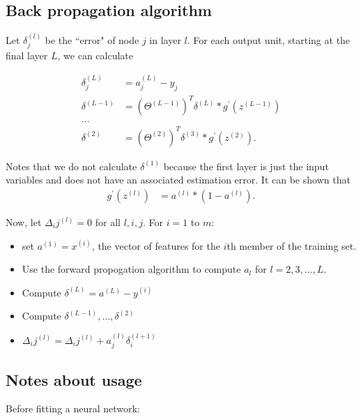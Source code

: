 \documentclass{article}
\begin{document}
\subsection{Back propagation algorithm}

Let $\delta_j^{(l)}$ be the ``error" of node $j$ in layer $l$. For each output unit, starting at the final layer $L$, we can calculate

\begin{align}
\delta_j^{(L)} & = a_j^{(L)} - y_j \nonumber \\
\delta^{(L-1)} & = (\Theta^{(L-1)})^T \delta^{(L)} * g^{\prime}(z^{(L-1)}) \nonumber \\
\dots \nonumber \\
\delta^{(2)} & = (\Theta^{(2)})^T \delta^{(3)} * g^{\prime}(z^{(2)}). \nonumber
\end{align}

Notes that we do not calculate $\delta^{(1)}$ because the first layer is just the input variables and does not have an associated estimation error. It can be shown that
\begin{align}
g^{\prime}(z^{(l)}) & = a^{(l)}*(1 - a^{(l)}). \nonumber
\end{align}

Now, let $\Delta_ij^{(l)} = 0$ for all $l, i, j$. For $i= 1$ to $m$: 

\begin{itemize}
\item set $a^{(1)} = x^{(i)}$, the vector of features for the $i$th member of the training set. 
\item Use the forward propogation algorithm to compute $a_l$ for $l = 2,3, \dots, L$. 
\item Compute $\delta^{(L)} = a^{(L)} - y^{(i)}$
\item Compute $\delta^{(L-1)}, \dots, \delta^{(2)}$
\item $\Delta_ij^{(l)} = \Delta_ij^{(l)} + a_j^{(l)} \delta_i^{(l+1)}$
\end{itemize}

\subsection{Notes about usage}

Before fitting a neural network:
\end{document}
